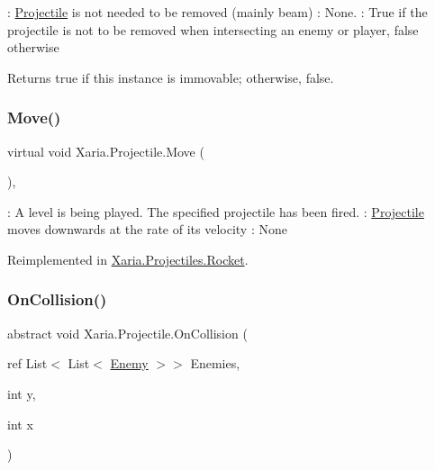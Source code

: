 \+: \hyperlink{classXaria_1_1Projectile}{Projectile} is not needed to be removed (mainly beam) \+: None. \+: True if the projectile is not to be removed when intersecting an enemy or player, false otherwise 

\begin{DoxyReturn}{Returns}
{\ttfamily true} if this instance is immovable; otherwise, {\ttfamily false}. 
\end{DoxyReturn}
\mbox{\label{classXaria_1_1Projectile_a7ac9f22571f1bb0059e684f1cb755559}} 
\subsubsection{\texorpdfstring{Move()}{Move()}}
{\footnotesize\ttfamily virtual void Xaria.\+Projectile.\+Move (\begin{DoxyParamCaption}{ }\end{DoxyParamCaption})\hspace{0.3cm}{\ttfamily [inline]}, {\ttfamily [virtual]}}



\+: A level is being played. The specified projectile has been fired. \+: \hyperlink{classXaria_1_1Projectile}{Projectile} moves downwards at the rate of its velocity \+: None 



Reimplemented in \hyperlink{classXaria_1_1Projectiles_1_1Rocket_a6f9beb147ddfbac24227ecb80fdbc71e}{Xaria.\+Projectiles.\+Rocket}.

\mbox{\label{classXaria_1_1Projectile_a9c2185ee6c1cf40e1cf846aa196ba514}} 
\subsubsection{\texorpdfstring{On\+Collision()}{OnCollision()}\hspace{0.1cm}{\footnotesize\ttfamily [1/2]}}
{\footnotesize\ttfamily abstract void Xaria.\+Projectile.\+On\+Collision (\begin{DoxyParamCaption}\item[{ref List$<$ List$<$ \hyperlink{classXaria_1_1Enemy}{Enemy} $>$$>$}]{Enemies,  }\item[{int}]{y,  }\item[{int}]{x }\end{DoxyParamCaption})\hspace{0.3cm}{\ttfamily [pure virtual]}}



